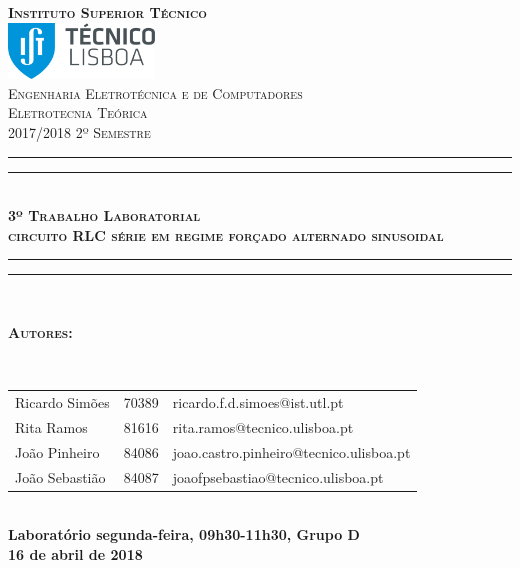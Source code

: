 \documentclass[a4paper, titlepage, portuguese]{article}
\begin{document}
	\begin{titlepage}
		\center
		\textsc{\bfseries\LARGE Instituto Superior Técnico}\\[1cm] %
		\includegraphics[height=1.5cm]{IST_Logo.pdf}\\[2.5cm]

		\textsc{\large Engenharia Eletrotécnica e de Computadores}\\[0.5cm] %
		\textsc{\Large Eletrotecnia Teórica}\\[0.5cm] %
		\textsc{\large 2017/2018 2º Semestre}\\[2cm]

		\rule{\textwidth}{1.6pt}\vspace*{-\baselineskip}\vspace*{2pt} %
		\rule{\textwidth}{0.4pt}\\[\baselineskip] %
			\textsc{\Huge \bfseries 3º Trabalho Laboratorial}\\[0.2cm]
			\bigskip
			\textsc{\large \bfseries circuito RLC série em regime forçado alternado sinusoidal}\\[0.2cm]
		\rule{\textwidth}{0.4pt}\vspace*{-\baselineskip}\vspace{3.2pt} %
		\rule{\textwidth}{1.6pt}\\[7cm]

		\begin{minipage}{0.9\textwidth}
			\begin{flushleft} \large
				\begin{Large}\bfseries\textsc{Autores:}\end{Large}\\[0.4cm]
				\begin{tabular}{l l l}
					Ricardo Simões			& 70389 & \normalsize ricardo.f.d.simoes@ist.utl.pt \\
					Rita Ramos					& 81616 & \normalsize rita.ramos@tecnico.ulisboa.pt \\
					João Pinheiro				& 84086 & \normalsize joao.castro.pinheiro@tecnico.ulisboa.pt \\
					João Sebastião			& 84087 & \normalsize joaofpsebastiao@tecnico.ulisboa.pt \\
				\end{tabular}
			\end{flushleft}
		\end{minipage}\\[0.5cm]

		\large \bfseries Laboratório segunda-feira, 09h30-11h30, Grupo D\\
		\large 16 de abril de 2018\\[1cm]
		\setcounter{page}{0}
	\end{titlepage}
\end{document}
